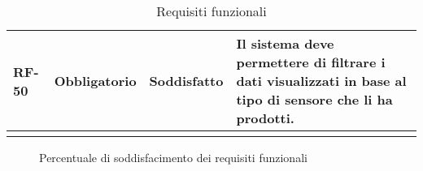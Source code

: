 \begin{longtable}{|>{\centering\arraybackslash}m{}|>{\centering\arraybackslash}m{}|>{\centering\arraybackslash}m{}|>{\centering\arraybackslash}m{}|}
	RF-50           & Obbligatorio        & Soddisfatto & Il sistema deve permettere di filtrare i dati visualizzati in base al tipo di sensore che li ha prodotti.
	\\\hline
	\caption{Requisiti funzionali}
\end{longtable}

\begin{figure}[!h]
	\centering
	\caption{Percentuale di soddisfacimento dei requisiti funzionali}
\end{figure}

